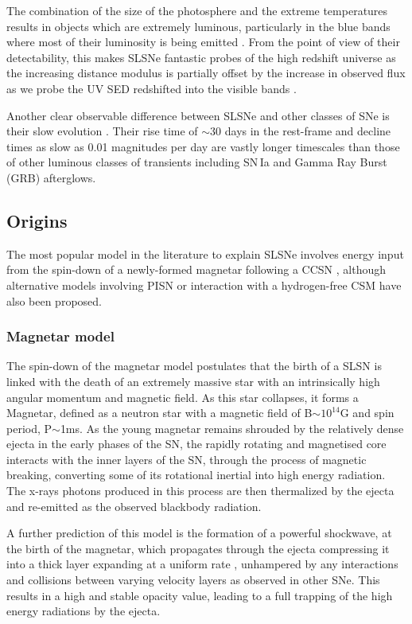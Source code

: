 The combination of the size of the photosphere and the extreme temperatures results in objects which are extremely luminous, particularly in the blue bands where most of their luminosity is being emitted \citep{Yan2017}. From the point of view of their detectability, this makes SLSNe fantastic probes of the high redshift universe as the increasing distance modulus is partially offset by the increase in observed flux as we probe the UV SED redshifted into the visible bands \citep{Smith2018}.

Another clear observable difference between SLSNe and other classes of SNe is their slow evolution \citep{Gal-Yam2009, Inserra2013, Nicholl2015a}. Their rise time of $\sim$30 days in the rest-frame and decline times as slow as 0.01 magnitudes per day are vastly longer timescales than those of other luminous classes of transients including SN\,Ia and Gamma Ray Burst (GRB) afterglows.

\subsection{Origins} \label{sec:Origins}
The most popular model in the literature to explain SLSNe involves energy input from the spin-down of a newly-formed magnetar following a CCSN \citep{Kasen2009,Woosley2010,Inserra2013}, although alternative models involving PISN \citep{Woosley2007,Yan2015} or interaction with a hydrogen-free CSM \citep{Chevalier2011,Chatzopoulos2013,Sorokina2015} have also been proposed.

\subsubsection{Magnetar model}
The spin-down of the magnetar model postulates that the birth of a SLSN is linked with the death of an extremely massive star with an intrinsically high angular momentum and magnetic field. As this star collapses, it forms a Magnetar, defined as a neutron star with a magnetic field of B$\sim10^{14}$G and spin period, P$\sim$1ms. As the young magnetar remains shrouded by the relatively dense ejecta in the early phases of the SN, the rapidly rotating and magnetised core interacts with the inner layers of the SN, through the process of magnetic breaking, converting some of its rotational inertial into high energy radiation. The x-rays photons produced in this process are then thermalized by the ejecta and re-emitted as the observed blackbody radiation.

A further prediction of this model is the formation of a powerful shockwave, at the birth of the magnetar, which propagates through the ejecta compressing it into a thick layer \citep{Jerkstrand2016,Chen2018} expanding at a uniform rate \citep{Inserra2013}, unhampered by any interactions and collisions between varying velocity layers as observed in other SNe. This results in a high and stable opacity value, leading to a full trapping of the high energy radiations by the ejecta.

